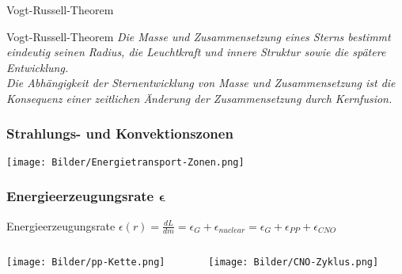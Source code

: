 \documentclass{beamer}
\begin{document}
\begin{frame}{Vogt-Russell-Theorem}

  \begin{block}{Vogt-Russell-Theorem}
\textit{\glqq Die Masse und Zusammensetzung eines Sterns bestimmt eindeutig seinen Radius, die Leuchtkraft und innere Struktur sowie die spätere Entwicklung\grqq .}\\[0.3cm]
\textit{\glqq Die Abhängigkeit der Sternentwicklung von Masse und Zusammensetzung ist die Konsequenz einer zeitlichen Änderung der Zusammensetzung durch Kernfusion\grqq .}\\
  \end{block}

\end{frame}

\begin{frame}
  \frametitle{Strahlungs- und Konvektionszonen}

\centering
\texttt{[image: Bilder/Energietransport-Zonen.png]}

\end{frame}

\begin{frame}
  \frametitle{Energieerzeugungsrate $\mathbf{\epsilon}$}
  
  \begin{block}{Energieerzeugungsrate}
    $\epsilon(r) = \frac{dL}{dm} = \epsilon_G + \epsilon_{nuclear} = \epsilon_G + \epsilon_{PP} + \epsilon_{CNO}$
  \end{block}
 
\begin{columns}[t]

\begin{column}{.48\textwidth}

\texttt{[image: Bilder/pp-Kette.png]}

\end{column}

\begin{column}{.48\textwidth}

\texttt{[image: Bilder/CNO-Zyklus.png]}

\end{column}

\end{columns}

\end{frame}
\end{document}
